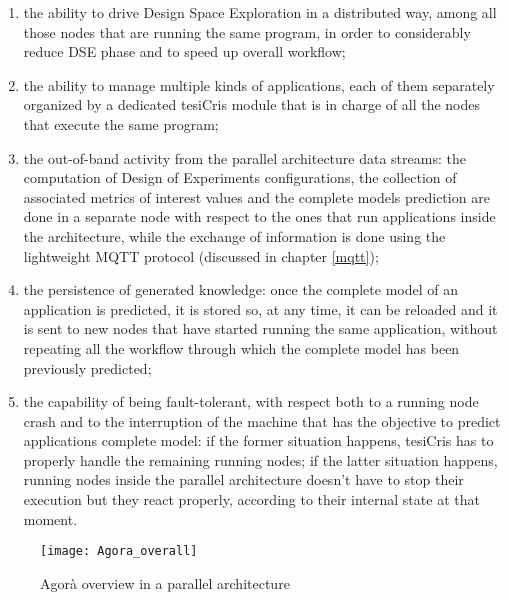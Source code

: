 \begin{enumerate}
    
    \item the ability to drive Design Space Exploration in a distributed way, among all those nodes that are running the same program, in order to considerably reduce DSE phase and to speed up overall workflow;
    
    \item the ability to manage multiple kinds of applications, each of them separately organized by a dedicated tesiCris module that is in charge of all the nodes that execute the same program;
    
    \item the out-of-band activity from the parallel architecture data streams: the computation of Design of Experiments configurations, the collection of associated metrics of interest values and the complete models prediction are done in a separate node with respect to the ones that run applications inside the architecture, while the exchange of information is done using the lightweight MQTT protocol (discussed in chapter \ref{mqtt});
    
    \item the persistence of generated knowledge: once the complete model of an application is predicted, it is stored so, at any time, it can be reloaded and it is sent to new nodes that have started running the same application, without repeating all the workflow through which the complete model has been previously predicted;
    
    \item the capability of being fault-tolerant, with respect both to a running node crash and to the interruption of the machine that has the objective to predict applications complete model: if the former situation happens, tesiCris has to properly handle the remaining running nodes; if the latter situation happens, running nodes inside the parallel architecture doesn't have to stop their execution but they react properly, according to their internal state at that moment.

\end{enumerate}

\begin{figure}[H]

    \centering
    \texttt{[image: Agora\_overall]}
    \caption{Agorà overview in a parallel architecture}
    \label{fig::tesiCris_overview}
    
\end{figure}

